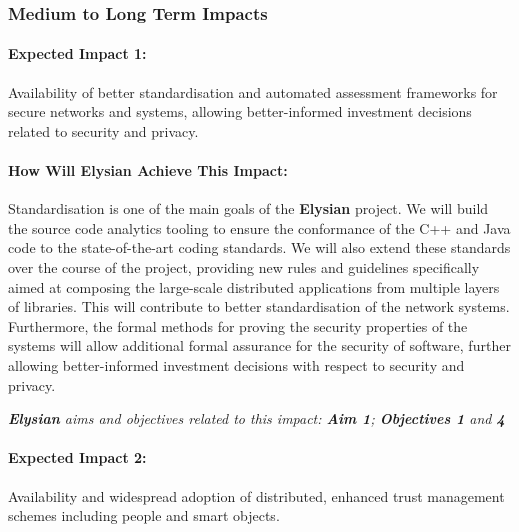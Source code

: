 \documentclass[a4paper,11pt]{article}
\newcommand{\project}[1]{\textbf{#1}\xspace}
\newcommand{\SECURITY}{\project{Elysian}}
\newcommand{\TheProject}{\SECURITY}
\begin{document}
\subsubsection{Medium to Long Term Impacts}

\begin{mdframed}[backgroundcolor=blue!5]
\paragraph{Expected Impact 1:}
Availability of better standardisation and automated assessment frameworks for secure networks and systems, allowing better-informed investment decisions related to security and privacy.
\end{mdframed}

\begin{mdframed}[backgroundcolor=gray!10]
\paragraph{How Will \TheProject{} Achieve This Impact:}
Standardisation is one of the main goals of the \TheProject{} project. We will build the source code analytics tooling to ensure the conformance of the C++ and Java code to the state-of-the-art coding standards. We will also extend these standards over the course of the project, providing new rules and guidelines specifically aimed at composing the large-scale distributed applications from multiple layers of libraries. This will contribute to better standardisation of the network systems. Furthermore, the formal methods for proving the security properties of the systems will allow additional formal assurance for the security of software, further allowing better-informed investment decisions with respect to security and privacy.

\emph{\TheProject{} aims and objectives related to this impact: \textbf{Aim 1}; \textbf{Objectives 1} and \textbf{4}}

\end{mdframed}

\begin{mdframed}[backgroundcolor=blue!5]
\paragraph{Expected Impact 2:}
Availability and widespread adoption of distributed, enhanced trust management schemes including people and smart objects.
\end{mdframed}
\end{document}

